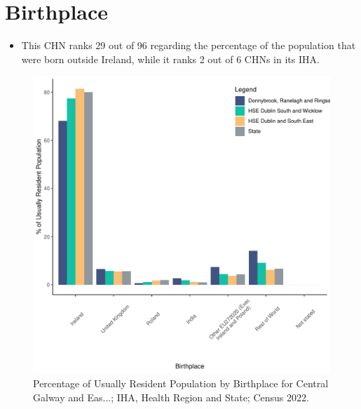 \documentclass{article}
\begin{document}
\section{Birthplace}\label{sect:Birth}
\begin{itemize}
\item This CHN ranks  29 out of 96 regarding the percentage of the population that were born outside Ireland, while it ranks  2 out of 6 CHNs in its IHA.
\end{itemize}
\begin{figure}[H]
	\centering
	\includegraphics[width = 130mm]{../figures/BirthED.pdf}
	\caption{Percentage of Usually Resident Population by Birthplace for Central Galway and Eas...; IHA, Health Region and State; Census 2022.}
	\label{fig:vbnv}
	\end{figure}
	
\end{document}
